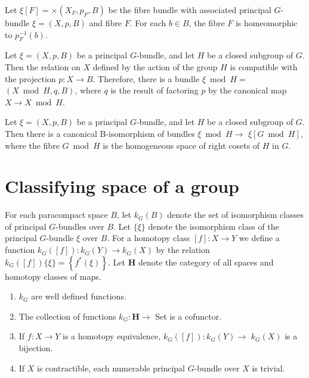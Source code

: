 \begin{prop}

Let $\xi[F]=\times\left(X_F, p_F, B\right)$ be the fibre bundle with associated principal $G$-bundle $\xi=(X, p, B)$ and fibre $F$. For each $b \in B$, the fibre $F$ is homeomorphic to $p_F^{-1}(b)$.

\end{prop}


Let $\xi=(X, p, B)$ be a principal $G$-bundle, and let $H$ be a closed subgroup of $G$. Then the relation on $X$ defined by the action of the group $H$ is compatible with the projection $p: X \rightarrow B$. Therefore, there is a bundle $\xi \bmod H=$ $(X \bmod H, q, B)$, where $q$ is the result of factoring $p$ by the canonical map $X \rightarrow X \bmod H$.

\begin{theo}
    Let $\xi=(X, p, B)$ be a principal $G$-bundle, and let $H$ be a closed subgroup of $G$. Then there is a canonical B-isomorphism of bundles $\xi \bmod H \rightarrow$ $\xi[G \bmod H]$, where the fibre $G \bmod H$ is the homogeneous space of right cosets of $H$ in $G$.
\end{theo}



\section{Classifying space of a group}

For each paracompact space $B$, let $k_G(B)$ denote the set of isomorphism classes of principal $G$-bundles over $B$. Let $\{\xi\}$ denote the isomorphism class of the principal $G$-bundle $\xi$ over $B$. For a homotopy class $[f]: X \rightarrow Y$ we define a function $k_G([f]): k_G(Y) \rightarrow k_G(X)$ by the relation $k_G([f])\{\xi\}= \left\{f^*(\xi)\right\}$.
Let $\mathbf{H}$ denote the category of all spaces and homotopy classes of maps.

\begin{theo}
    \begin{enumerate}
        \item $k_G$ are well defined functions.
        \item The collection of functions $k_G: \mathbf{H} \rightarrow$ Set is a cofunctor.
        \item If $f: X \rightarrow Y$ is a homotopy equivalence, $k_G([f]): k_G(Y) \rightarrow$ $k_G(X)$ is a bijection.
        \item If $X$ is contractible, each numerable principal $G$-bundle over $X$ is trivial.
    \end{enumerate}
\end{theo}

